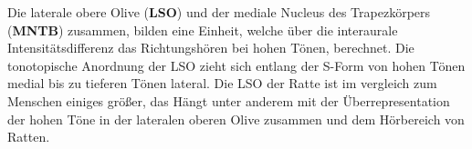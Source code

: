 \documentclass[12pt,a4paper,pdftex]{article}
\begin{document}
 
\noindent Die laterale obere Olive (\textbf{LSO}) und der mediale Nucleus des Trapezkörpers (\textbf{MNTB}) zusammen, bilden eine Einheit, welche über die interaurale Intensitätsdifferenz das Richtungshören bei hohen Tönen, berechnet. 
 Die tonotopische Anordnung der LSO zieht sich entlang der S-Form von hohen Tönen medial bis zu tieferen Tönen lateral. Die LSO der Ratte ist im vergleich zum Menschen einiges größer, das Hängt unter anderem mit der Überrepresentation der hohen Töne in der lateralen oberen Olive zusammen und dem Hörbereich von Ratten.
\\

\end{document}
